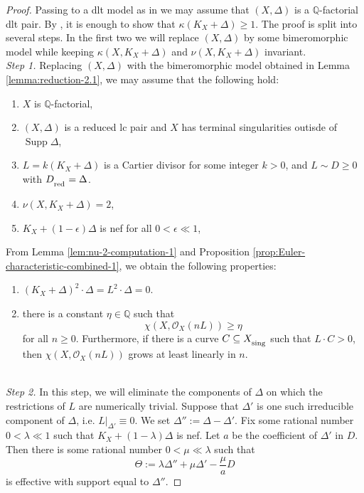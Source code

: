 \documentclass[12pt]{amsart}
\newcommand{\mbQ}{\mathbb{Q}}
\newcommand{\<}{\leq}
\def\>{\geq}
\def\eps{\epsilon}
\def\subset{\subseteq}
\newcommand{\D}{\Delta}
\def\mcO{\mathcal{O}}
\theoremstyle{remark}
\theoremstyle{definition}
\theoremstyle{definition}
\numberwithin{equation}{section}
\theoremstyle{definition}
\theoremstyle{definition}
\def\Supp{\operatorname{Supp}}
\def\sing{\operatorname{\textsubscript{\rm sing}}}
\def\red{\operatorname{\textsubscript{\rm red}}}
\begin{document}
\begin{proof} 
Passing to a dlt model as in \cite[Theorem 5.2]{DasOu2022} we may assume that $(X,\Delta)$ is a $\mbQ$-factorial dlt pair. 
By \cite[Theorem 7.2]{DasOu2022}, it is enough to show that $\kappa(K_X+\Delta)\> 1.$  
The proof is split into several steps. 
In the first two  we will replace $(X,\D)$ by some bimeromorphic model while keeping $\kappa(X,K_X+\Delta)$ and 
$\nu(X,K_X+\Delta)$ invariant.\\

\noindent
\textit{Step 1.} 
Replacing $(X,\Delta)$ with the bimeromorphic model obtained in Lemma \ref{lemma:reduction-2.1}, we may assume that the following hold:
\begin{enumerate}
\item $X$ is $\mathbb{Q}$-factorial, 
\item $(X,\Delta)$ is a reduced lc  pair and $X$ has terminal singularities outisde of $\Supp\Delta$,  
\item $L = k(K_X+\Delta)$ is a Cartier divisor for some integer $k>0$,   
      and  $L \sim D \> 0$ with $D_{\red} = \Delta$.
\item $\nu(X, K_X+\Delta) = 2$,
\item $K_X+(1-\eps)\Delta$ is nef for all $0<\eps\ll 1$, 
\end{enumerate} 
From Lemma \ref{lem:nu-2-computation-1} and Proposition \ref{prop:Euler-characteristic-combined-1}, we obtain the following properties:
\begin{enumerate}
    \item[(6)] $(K_X+\Delta)^2 \cdot \Delta= L^2 \cdot \Delta = 0$.
    \item[(7)] there is a constant $\eta\in\mbQ$ such that
\[
\chi(X,\mcO_X({nL})) \> \eta 
\] 
for all $n\> 0$.
Furthermore, if there is a curve $C\subseteq X_{\sing}$ such that $L\cdot C >0$, then $\chi(X, \mathscr{O}_{{X}}(n L) ) $ grows at least linearly in $n$. 
\end{enumerate}~\\

\noindent
\textit{Step 2.} 
In this step, we will eliminate the components of $\Delta$  on which the restrictions of $L$ are numerically trivial.
Suppose that $\Delta'$ is one such irreducible component of $\Delta$, i.e. $L|_{\Delta'}\equiv 0$. 
We set $\Delta'':=\Delta-\Delta'$. 
Fix some rational number $0<\lambda \ll 1$ such that $K_X+(1-\lambda)\D$ is nef. 
Let $a$ be the coefficient of $\D'$ in $D$.
Then there is some rational number $0<\mu \ll \lambda$ such that  
\begin{equation}\label{eqn:theta-perturbation} 
\Theta := \lambda \Delta'' + \mu\D' - \frac{\mu}{a} D
\end{equation} 
is effective with support equal to $\D''$. 


\end{proof}
\end{document}

